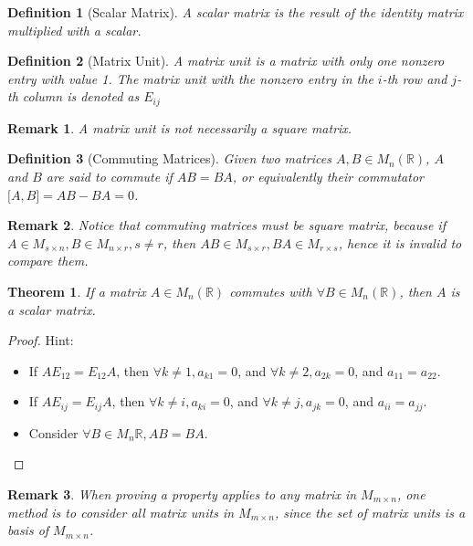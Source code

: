 \documentclass[onecolumn]{ctexart}
\newtheorem{definition}{Definition}
\newtheorem{theorem}{Theorem}
\newtheorem{remark}{Remark}
\begin{document}
\begin{definition}[Scalar Matrix]
  A scalar matrix is the result of the identity matrix multiplied with a scalar.
\end{definition}

\begin{definition}[Matrix Unit]
  A matrix unit is a matrix with only one nonzero entry with value 1. The matrix 
  unit with the nonzero entry in the $i$-th row and $j$-th column is denoted as 
  $E_{ij}$
\end{definition}
\begin{remark}
  A matrix unit is not necessarily a square matrix.
\end{remark}

\begin{definition}[Commuting Matrices]
  Given two matrices $A, B \in M_n(\mathbb{R})$, $A$ and $B$ are said to commute 
  if $AB = BA$, or equivalently their commutator $\lbrack A, B \rbrack = AB - BA 
  = 0$.
\end{definition}
\begin{remark}
  Notice that commuting matrices must be square matrix, because if $A \in M_{s 
  \times n}, B \in M_{n \times r}, s \neq r$, then $AB \in M_{s \times r}, BA 
  \in M_{r \times s}$, hence it is invalid to compare them.
\end{remark}

\begin{theorem}
  If a matrix $A \in M_n(\mathbb{R})$ commutes with $\forall B \in 
  M_n(\mathbb{R})$, then $A$ is a scalar matrix.
\end{theorem}
\begin{proof}
  Hint:
  \begin{itemize}
    \item If $AE_{12} = E_{12}A$, then $\forall k \neq 1, a_{k1} = 0$, and 
    $\forall k \neq 2, a_{2k} = 0$, and $a_{11} = a_{22}$.
    \item If $AE_{ij} = E_{ij}A$, then $\forall k \neq i, a_{ki} = 0$, and 
    $\forall k \neq j, a_{jk} = 0$, and $a_{ii} = a_{jj}$.
    \item Consider $\forall B \in M_n{\mathbb{R}}, AB = BA$.
  \end{itemize}
\end{proof}
\begin{remark}
  When proving a property applies to any matrix in $M_{m \times n}$, one method 
  is to consider all matrix units in $M_{m \times n}$, since the set of matrix 
  units is a basis of $M_{m \times n}$.
\end{remark}
\end{document}
